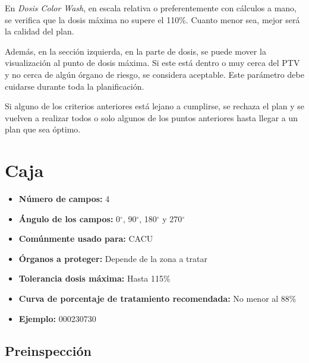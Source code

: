 \documentclass{article}
\begin{document}
En \textit{Dosis Color Wash}, en escala relativa o preferentemente con cálculos a mano, se verifica que la dosis máxima no supere el 110\%. Cuanto menor sea, mejor será la calidad del plan.

Además, en la sección izquierda, en la parte de dosis, se puede mover la visualización al punto de dosis máxima. Si este está dentro o muy cerca del PTV y no cerca de algún órgano de riesgo, se considera aceptable. Este parámetro debe cuidarse durante toda la planificación.

Si alguno de los criterios anteriores está lejano a cumplirse, se rechaza el plan y se vuelven a realizar todos o solo algunos de los puntos anteriores hasta llegar a un plan que sea óptimo.

\vspace{3pt}

\section{Caja}

\begin{center}
    \begin{tcolorbox}[colback=gray!25!white, colframe=gray, title=\textbf{Resumen}, width=0.8\linewidth, center title]
        \begin{itemize}
            \item \textbf{Número de campos:} 4
            \item \textbf{Ángulo de los campos:} 0$^{\circ}$, 90$^{\circ}$, 180$^{\circ}$ y 270$^{\circ}$
            \item \textbf{Comúnmente usado para:} CACU
            \item \textbf{Órganos a proteger:} Depende de la zona a tratar
            \item \textbf{Tolerancia dosis máxima:} Hasta 115\%
            \item \textbf{Curva de porcentaje de tratamiento recomendada:} No menor al 88\%
            \item \textbf{Ejemplo:} 000230730
        \end{itemize}
    \end{tcolorbox}
\end{center}

\subsection{Preinspección}
\end{document}
